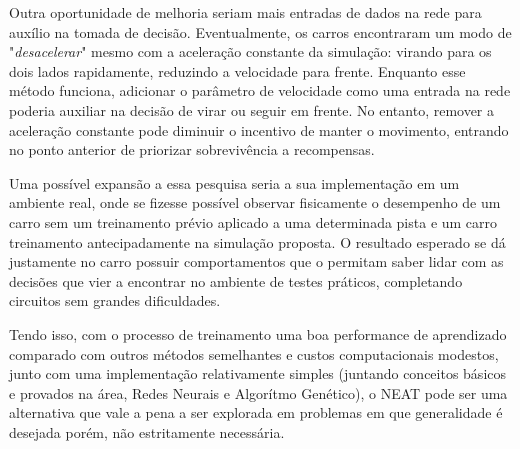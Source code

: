 Outra oportunidade de melhoria seriam mais entradas de dados na 
rede para aux{\'i}lio na tomada de decis{\~a}o. Eventualmente, os 
carros encontraram um modo de "\textit{desacelerar}"  mesmo com a 
acelera{\c c}{\~a}o constante da simula{\c c}{\~a}o: virando para 
os dois lados rapidamente, reduzindo a velocidade para frente. 
Enquanto esse m{\'e}todo funciona, adicionar o par{\^a}metro 
de velocidade como uma entrada na rede poderia auxiliar na decis{\~a}o 
de virar ou seguir em frente. No entanto, remover a acelera{\c c}{\~a}o 
constante pode diminuir o incentivo de manter o movimento, 
entrando no ponto anterior de priorizar sobreviv{\^e}ncia a recompensas.

Uma possível expansão a essa pesquisa seria a sua implementação em um ambiente real, 
onde se fizesse possível observar fisicamente o desempenho de um carro sem um treinamento prévio aplicado a uma determinada 
pista e um carro treinamento antecipadamente na simulação proposta. O resultado esperado se dá justamente no carro possuir 
comportamentos que o permitam saber lidar com as decisões que vier a encontrar no ambiente de testes práticos, completando circuitos 
sem grandes dificuldades.

Tendo isso, com o processo de treinamento uma boa
performance de aprendizado comparado com outros
m{\'e}todos semelhantes e custos computacionais 
modestos, junto com uma implementa{\c c}{\~a}o 
relativamente simples (juntando conceitos
básicos e provados na {\'a}rea, Redes Neurais e
Algor{\'i}tmo Gen{\'e}tico), o NEAT pode ser uma
alternativa que vale a pena a ser explorada em
problemas em que generalidade {\'e} desejada
por{\'e}m, n{\~a}o estritamente necess{\'a}ria.
